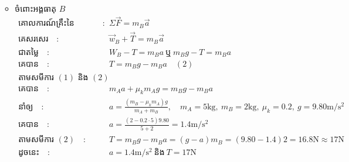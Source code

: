 \documentclass{classes/exam}
\begin{document}
\begin{enumerate}[I]
\begin{itemize}
\begin{align*}
			\end{align*}
		\item ចំពោះអង្គធាតុ $B$
			\begin{align*}
				\text{គោលការណ៍គ្រឹះនៃឌីណាមិច}\quad :&\quad \Sigma \vec{F}=m_{B}\vec{a}\\
				\text{គេសរសេរ}\quad :&\quad \overrightarrow{w}_{B}+\overrightarrow{T}=m_{B}\vec{a}\\
				\text{ជាតម្លៃ}\quad :&\quad W_{B}-T=m_{B}a~\text{ឬ}~m_{B}g-T=m_{B}a\\
				\text{គេបាន}\quad :&\quad T=m_{B}g-m_{B}a\quad (2)\\
				\text{តាមសមីការ $\left(1\right)$ និង $\left(2\right)$}\\
				\text{គេបាន}\quad :&\quad m_{A}a+\mu_{k}m_{A}g=m_{B}g-m_{B}a\\
				\text{នាំឲ្យ}\quad :&\quad a=\frac{\left(m_{B}-\mu_{k}m_{A}\right)g}{m_{A}+m_{B}},\quad m_{A}=5\si{\kilogram},~m_{B}=2\si{\kilogram},~\mu_{k}=0.2,~g=9.80\si{\metre/\second^{2}}\\
				\text{គេបាន}\quad :&\quad a=\frac{\left(2-0.2\cdot 5\right)9.80}{5+2}=1.4\si{\metre/\second^{2}}\\
				\text{តាមសមីការ $\left(2\right)$}\quad :&\quad T=m_{B}g-m_{B}a=\left(g-a\right)m_{B}=\left(9.80-1.4\right)2=16.8\si{\newton}\approx 17\si{\newton}\\
				\text{ដូចនេះ}\quad :&\quad a=1.4\si{\metre/\second^{2}}~\text{និង}~T=17\si{\newton}
			\end{align*}
	\end{itemize}
\end{enumerate}
\end{document}
